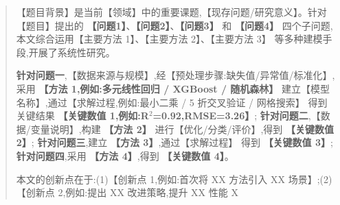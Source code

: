 
\begin{abstract}

【题目背景】是当前【领域】中的重要课题,【现存问题/研究意义】。针对【题目】提出的 \textbf{【问题1】}、\textbf{【问题2】}、\textbf{【问题3】} 和 \textbf{【问题4】} 四个子问题,本文综合运用【主要方法 1】、【主要方法 2】、【主要方法 3】 等多种建模手段,开展了系统性研究。

\textbf{针对问题一},【数据来源与规模】,经【预处理步骤:缺失值/异常值/标准化】,采用 \textbf{【方法 1,例如:多元线性回归 / XGBoost / 随机森林】} 建立【模型名称】,通过【求解过程,例如:最小二乘 / 5 折交叉验证 / 网格搜索】 得到关键结果 \textbf{【关键数值 1,例如:R$^2$=0.92,RMSE=3.26】}; \textbf{针对问题二},【数据/变量说明】,构建 \textbf{【方法 2】} 进行【优化/分类/评价】,得到 \textbf{【关键数值 2】}; \textbf{针对问题三},建立 \textbf{【方法 3】},通过【求解过程】 得到 \textbf{【关键数值 3】}; \textbf{针对问题四},采用 \textbf{【方法 4】},得到 \textbf{【关键数值 4】}。

本文的创新点在于:(1)【创新点 1,例如:首次将 XX 方法引入 XX 场景】;(2)【创新点 2,例如:提出 XX 改进策略,提升 XX 性能 X%

\label{abstract:end}

\end{abstract}
